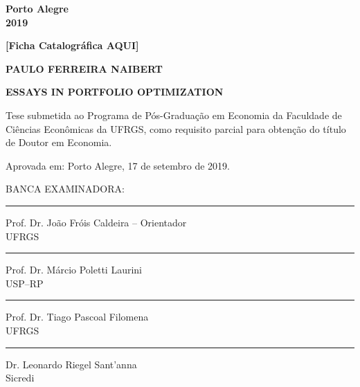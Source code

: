 \documentclass[12pt,oneside,a4paper]{memoir}
\begin{document}
\begin{center}
\textbf{Porto Alegre
\\
2019}
\end{center}

\clearpage

\begin{center}
\textbf{[Ficha Catalográfica AQUI]}
\end{center}

% 

\clearpage

\begin{center}
\textbf{PAULO FERREIRA NAIBERT}
\end{center}

\vspace{3 em}

\begin{center}
\textbf{ESSAYS IN PORTFOLIO OPTIMIZATION}
\end{center}

\vspace{3 em}
\hfill  
\begin{minipage}{.5\textwidth}
\begin{SingleSpace}
Tese submetida ao Programa de Pós-Graduação em Economia da Faculdade de Ciências Econômicas da UFRGS, como requisito parcial para obtenção do título de Doutor em Economia.
\end{SingleSpace}
\end{minipage}
\vfill

\noindent
Aprovada em: Porto Alegre, 17 de setembro de 2019.\\

\vfill

\noindent
BANCA EXAMINADORA:
%

\noindent
\rule{\textwidth}{1pt}
Prof. Dr. João Fróis Caldeira -- Orientador\\
UFRGS

\noindent
\rule{\textwidth}{1pt}
Prof. Dr. Márcio Poletti Laurini\\
USP--RP

\noindent
\rule{\textwidth}{1pt}
Prof. Dr. Tiago Pascoal Filomena\\
UFRGS

\noindent
\rule{\textwidth}{1pt}
Dr. Leonardo Riegel Sant'anna\\
Sicredi\\
\end{document}
